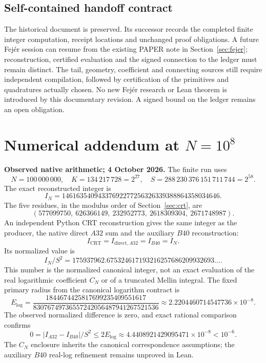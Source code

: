 \documentclass[11pt,a4paper]{article}
\theoremstyle{remark}
\begin{document}
\subsection*{Self-contained handoff contract}
The historical document  is preserved.
Its successor  records the completed finite
integer computation, receipt locations and unchanged proof obligations.
A future Fej\'er session can resume from the existing PAPER note in
Section~\ref{sec:fejer}; reconstruction, certified evaluation and the signed
connection to the ledger must remain distinct. The tail, geometry,
coefficient and connecting sources still require independent compilation,
followed by certification of the primitives and quadratures actually chosen.
No new Fej\'er research or Lean theorem is introduced by this documentary
revision. A signed bound on the ledger remains an open obligation.

\clearpage
\section{Numerical addendum at $N=10^8$}\label{app:numerical}
\textbf{Observed native arithmetic; 4 October 2026.} The finite run uses
\[
N=100\,000\,000,\quad K=134\,217\,728=2^{27},\quad
S=288\,230\,376\,151\,711\,744=2^{58}.
\]
The exact reconstructed integer is
\[
\boxed{I_N=14616354094337692277256326339388864358034646.}
\]
The five residues, in the modulus order of Section~\ref{sec:crt}, are
\[
(577099750,\ 626366149,\ 232952773,\ 2618309304,\ 2671748987).
\]
An independent Python CRT reconstruction gives the same integer as the
producer, the native direct $A32$ sum and the auxiliary $B40$ reconstruction:
\[
I_{\mathrm{CRT}}=I_{\mathrm{direct},A32}=I_{B40}=I_N.
\]
Its normalized value is
\[
I_N/S^2=175937962.675324617193216257686209932693\ldots.
\]
This number is the normalized canonical integer, not an exact evaluation of
the real logarithmic coefficient $C_N$ or of a truncated Mellin integral.
The fixed primary radius from the canonical logarithm contract is
\[
E_{\log}=\frac{1844674425817699235409551617}
{83076749736557242056487941267521536}
\approx2.2204460714547736\times10^{-8}.
\]
The observed normalized difference is zero, and exact rational comparison
confirms
\[
0=|I_{A32}-I_{B40}|/S^2\le2E_{\log}
\approx4.4408921429095471\times10^{-8}<10^{-6}.
\]
The $C_N$ enclosure inherits the canonical correspondence assumptions;
the auxiliary $B40$ real-log refinement remains unproved in Lean.
\end{document}
